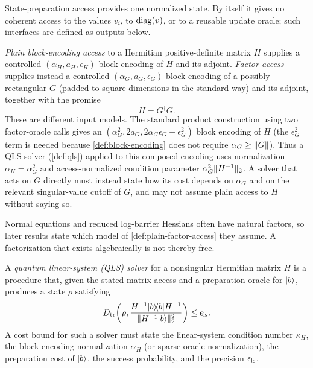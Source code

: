 State-preparation access provides one normalized state.  By itself it gives
no coherent access to the values $v_i$, to $\operatorname{diag}(v)$, or to a reusable update
oracle; such interfaces are defined as outputs below.

\begin{definition}
\label{def:plain-factor-access}
\emph{Plain block-encoding access} to a Hermitian positive-definite matrix
$H$ supplies a controlled $(\alpha_H,a_H,\epsilon_H)$ block encoding of $H$
and its adjoint.  \emph{Factor access} supplies instead a controlled
$(\alpha_G,a_G,\epsilon_G)$ block encoding of a possibly rectangular $G$
(padded to square dimensions in the standard way) and its adjoint, together
with the promise
\begin{equation}
 H=G^\dagger G.
 \label{eq:factor-access}
\end{equation}
These are different input models.  The standard product construction using
two factor-oracle calls gives an
$(\alpha_G^2,2a_G,2\alpha_G\epsilon_G+\epsilon_G^2)$ block encoding of $H$
(the $\epsilon_G^2$ term is needed because \cref{def:block-encoding} does not
require $\alpha_G\ge\lVert G\rVert$).  Thus a QLS solver (\cref{def:qls}) applied to this composed encoding uses normalization
$\alpha_H=\alpha_G^2$ and access-normalized condition parameter
$\alpha_G^2\lVert H^{-1}\rVert_2$.  A solver that acts on $G$ directly must instead
state how its cost depends on $\alpha_G$ and on the relevant singular-value
cutoff of $G$, and may not assume plain access to $H$ without saying so.
\end{definition}

Normal equations and reduced log-barrier Hessians often have natural factors,
so later results state which model of
\cref{def:plain-factor-access} they assume.  A factorization that
exists algebraically is not thereby free.

\begin{definition}
\label{def:qls}
A \emph{quantum linear-system (QLS) solver} for a nonsingular Hermitian matrix
$H$ is a procedure that, given the stated matrix access and a preparation
oracle for $\lvert b\rangle$, produces a state $\rho$ satisfying
\begin{equation}
 D_{\mathrm{tr}}\!\left(\rho,
 \frac{H^{-1}\lvert b\rangle\!\langle b\rvert H^{-1}}
      {\lVert H^{-1}\lvert b\rangle\rVert_2^2}\right)\leq\epsilon_{\rm ls}.
 \label{eq:qls-contract}
\end{equation}
A cost bound for such a solver must state the linear-system condition number
$\kappa_H$, the block-encoding normalization $\alpha_H$ (or sparse-oracle
normalization), the preparation cost of $\lvert b\rangle$, the success probability,
and the precision $\epsilon_{\rm ls}$.
\end{definition}

